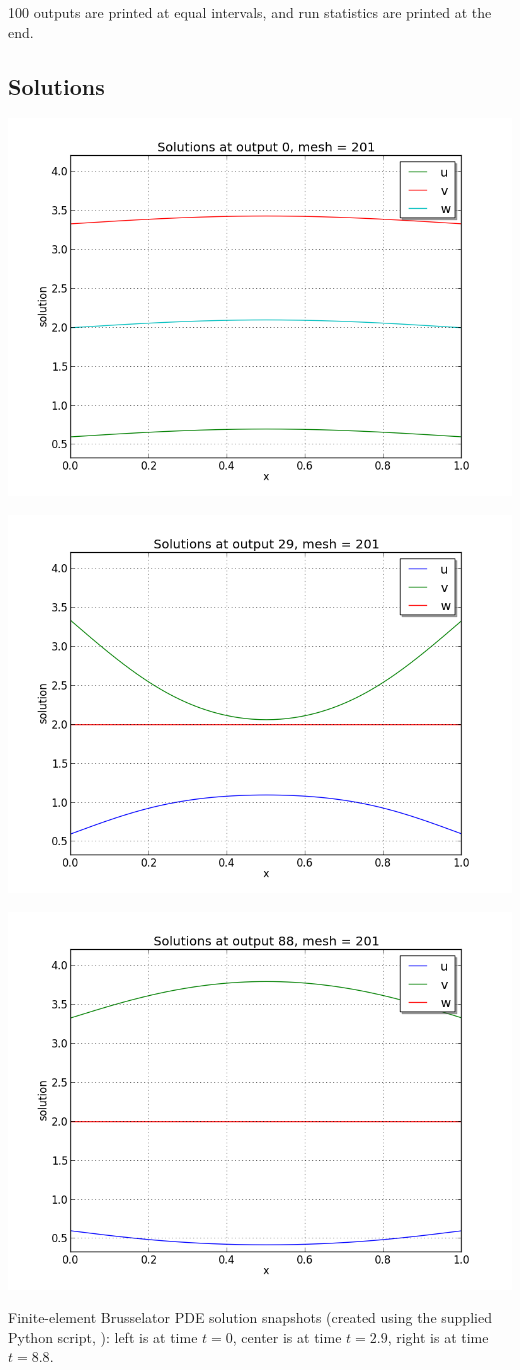 \documentclass[letterpaper,10pt,english]{sphinxmanual}
\begin{document}
100 outputs are printed at equal intervals, and run statistics
are printed at the end.


\subsection{Solutions}
\label{c_serial:id22}
\includegraphics[width=0.300\linewidth]{plot-ark_brusselator1D_FEM_1.png}

\includegraphics[width=0.300\linewidth]{plot-ark_brusselator1D_FEM_2.png}

\includegraphics[width=0.300\linewidth]{plot-ark_brusselator1D_FEM_3.png}

Finite-element Brusselator PDE solution snapshots (created using the
supplied Python script, ): left is at time
\(t=0\), center is at time \(t=2.9\), right is at time
\(t=8.8\).
\end{document}
